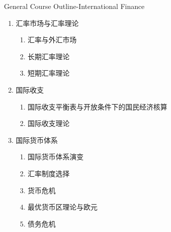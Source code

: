 \documentclass[10pt,hyperref={CJKbookmarks=true},xcolor=dvipsnames,aspectratio=169]{beamer}
\begin{document}
\begin{frame}{General Course Outline-International Finance}

\begin{enumerate}
	\item 汇率市场与汇率理论 
		\begin{enumerate}
			\item 汇率与外汇市场
			\item 长期汇率理论
			\item 短期汇率理论
		\end{enumerate}

	\item 国际收支 
		\begin{enumerate}
			\item 国际收支平衡表与开放条件下的国民经济核算
			\item 国际收支理论
		\end{enumerate}

	\item 国际货币体系 
		\begin{enumerate}
			\item 国际货币体系演变
			\item 汇率制度选择
			\item 货币危机
			\item 最优货币区理论与欧元
			\item 债务危机
		\end{enumerate}

\end{enumerate}
\end{frame}
\end{document}
